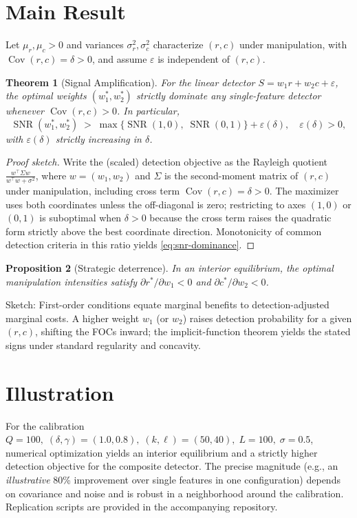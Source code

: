 \documentclass[preprint,12pt,authoryear]{elsarticle}
\newtheorem{theorem}{Theorem}
\newtheorem{proposition}[theorem]{Proposition}
\begin{document}
\section{Main Result}
Let $\mu_r,\mu_c>0$ and variances $\sigma_r^2,\sigma_c^2$ characterize $(r,c)$ under manipulation, with $\operatorname{Cov}(r,c)=\delta>0$, and assume $\varepsilon$ is independent of $(r,c)$.

\begin{theorem}[Signal Amplification]\label{thm:amplification}
For the linear detector $S=w_1 r + w_2 c + \varepsilon$, the optimal weights $(w_1^*,w_2^*)$ strictly dominate any single-feature detector whenever $\operatorname{Cov}(r,c)>0$. In particular,
\begin{equation}
\operatorname{SNR}(w_1^*,w_2^*)\;>\;\max\big\{\operatorname{SNR}(1,0),\;\operatorname{SNR}(0,1)\big\}+\varepsilon(\delta),\quad \varepsilon(\delta)>0,\label{eq:snr-dominance}
\end{equation}
with $\varepsilon(\delta)$ strictly increasing in $\delta$.
\end{theorem}

\begin{proof}[Proof sketch]
Write the (scaled) detection objective as the Rayleigh quotient $\tfrac{w^\top \Sigma w}{w^\top w + \sigma^2}$, where $w=(w_1,w_2)$ and $\Sigma$ is the second-moment matrix of $(r,c)$ under manipulation, including cross term $\operatorname{Cov}(r,c)=\delta>0$. The maximizer uses both coordinates unless the off-diagonal is zero; restricting to axes $(1,0)$ or $(0,1)$ is suboptimal when $\delta>0$ because the cross term raises the quadratic form strictly above the best coordinate direction. Monotonicity of common detection criteria in this ratio yields \eqref{eq:snr-dominance}.
\end{proof}

\begin{proposition}[Strategic deterrence]\label{prop:deterrence}
In an interior equilibrium, the optimal manipulation intensities satisfy $\partial r^*/\partial w_1<0$ and $\partial c^*/\partial w_2<0$.
\end{proposition}

\noindent Sketch: First-order conditions equate marginal benefits to detection-adjusted marginal costs. A higher weight $w_1$ (or $w_2$) raises detection probability for a given $(r,c)$, shifting the FOCs inward; the implicit-function theorem yields the stated signs under standard regularity and concavity.

\section{Illustration}
For the calibration $Q=100,\; (\delta,\gamma)=(1.0,0.8),\; (k,\ell)=(50,40),\; L=100,\; \sigma=0.5$, numerical optimization yields an interior equilibrium and a strictly higher detection objective for the composite detector. The precise magnitude (e.g., an \emph{illustrative} 80\% improvement over single features in one configuration) depends on covariance and noise and is robust in a neighborhood around the calibration. Replication scripts are provided in the accompanying repository.
\end{document}

